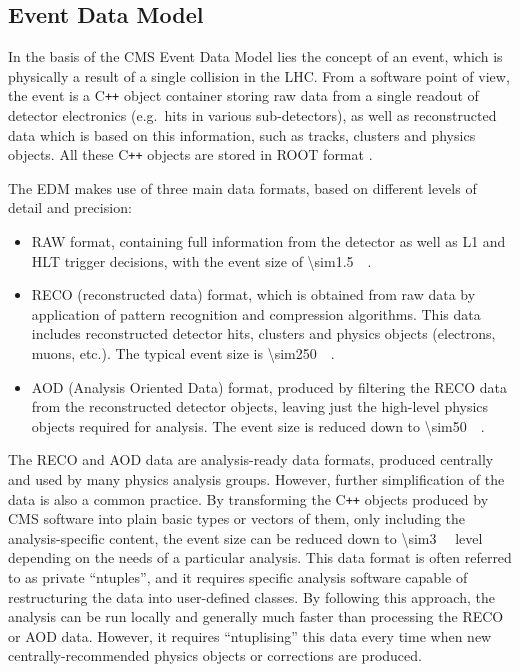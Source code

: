 \subsection{Event Data Model}
\label{ss:edm}
In the basis of the CMS Event Data Model lies the concept of an event, which is physically a result of a single
collision in the LHC. From a software point of view, the event is a C\verb!++! object container storing raw data from a
single readout of detector electronics (e.g.\ hits in various sub-detectors), as well as reconstructed data which is
based on this information, such as tracks, clusters and physics objects. All these C\verb!++! objects are stored in ROOT
format \cite{ROOT}.

The EDM makes use of three main data formats, based on different levels of detail and precision:
\begin{itemize}
  \item RAW format, containing full information from the detector as well as L1 and HLT trigger decisions, with the
  event size of \SI{\sim1.5}{\mega\byte}.
  \item RECO (reconstructed data) format, which is obtained from raw data by application of pattern recognition and
  compression algorithms. This data includes reconstructed detector hits, clusters and physics objects (electrons,
  muons, etc.). The typical event size is \SI{\sim250}{\kilo\byte}.
  \item AOD (Analysis Oriented Data) format, produced by filtering the RECO data from the reconstructed detector
  objects, leaving just the high-level physics objects required for analysis. The event size is reduced down to
  \SI{\sim50}{\kilo\byte}.
\end{itemize}

The RECO and AOD data are analysis-ready data formats, produced centrally and used by many physics analysis groups.
However, further simplification of the data is also a common practice. By transforming the C\verb!++! objects produced
by CMS software into plain basic types or vectors of them, only including the analysis-specific content, the event size
can be reduced down to \SI{\sim3}{\kilo\byte} level depending on the needs of a particular analysis. This data format is
often referred to as private ``ntuples'', and it requires specific analysis software capable of restructuring the data
into user-defined classes. By following this approach, the analysis can be run locally and generally much faster than
processing the RECO or AOD data. However, it requires ``ntuplising'' this data every time when new centrally-recommended
physics objects or corrections are produced.

